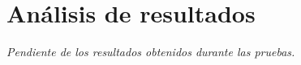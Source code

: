 \section{Análisis de resultados}

\textit{Pendiente de los resultados obtenidos durante las pruebas.}
